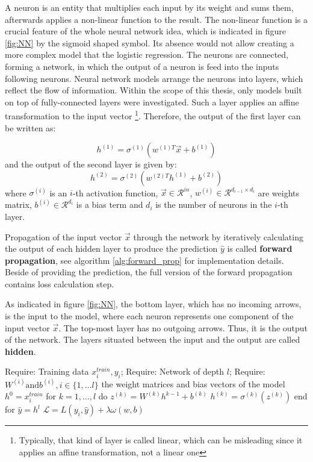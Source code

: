 A neuron is an entity that multiplies each input by its weight and sums them, afterwards applies a non-linear function to the result. The non-linear function is a crucial feature of the whole neural network idea, which is indicated in figure \ref{fig:NN} by the sigmoid shaped symbol. Its absence would not allow creating a more complex model that the logistic regression.  The neurons are connected, forming a network, in which the output of a neuron is feed into the inputs following neurons. Neural network models arrange the neurons into layers, which reflect the flow of information. Within the scope of this thesis, only models built on top of fully-connected layers were investigated. Such a layer applies an affine transformation to the input vector \footnote{Typically, that kind of layer is called linear, which can be misleading since it applies an affine transformation, not a linear one}. Therefore, the output of the first layer can be written as: 

\begin{equation}
h^{(1)} = \sigma^{(1)}(w^{(1)T}\vec{x}+b^{(1)})
\end{equation}
and the output of the  second layer is given by: 
\begin{equation}
h^{(2)} = \sigma^{(2)}(w^{(2)T}h^{(1)}+b^{(2)})
\end{equation}
where $  \sigma^{(i)}$ is an $i$-th activation function, $\vec{x} \in \mathcal{R}^{in}$, $w^{(i)} \in \mathcal{R}^{d_{i-1}\times d_{i}}$ are weights matrix, $b^{(i)} \in \mathcal{R}^{d_{i}}$ is a bias term and $d_{i}$ is the number of neurons in the $i$-th layer.  

Propagation of the input vector $\vec{x}$ through the network by iteratively calculating the output of each hidden layer to produce the prediction $\hat{y}$ is called \textbf{forward propagation}, see algorithm \ref{alg:forward_prop} for implementation details. Beside of providing the prediction, the full version of the forward propagation contains loss calculation step.  

As indicated in figure \ref{fig:NN}, the bottom layer, which has no incoming arrows, is the input to the model, where each neuron represents one component of the input vector $\vec{x}$. 
 The top-most layer has no outgoing arrows. Thus, it is the output of the network.  The layers situated between the input and the output are called \textbf{hidden}. 

\begin{algorithm}[caption={Forward propagation of feed-forward neural network }, label={alg:forward_prop}]
Require: Training data ${x^{train}_{i} , y_{i}}$;
Require: Network of depth $l$;
Require: $W^{(i)} \textrm{and}  b^{(i)}, i \in \{ 1, \ldots l \}$ the weight matrices and bias vectors of the model
$h^{0} =x^{train}_{i}$ 
for $k = 1, \ldots, l$ do
   $z^{(k)} = W^{(k)}h^{k-1} +b^{(k)}$ 
   $h^{(k)} = \sigma^{(k)}(z^{(k)})$
end for
$\hat{y} = h^{l}$
$\mathcal{L} = L(y_{i}, \hat{y}) + \lambda \omega(w, b)$
\end{algorithm}

